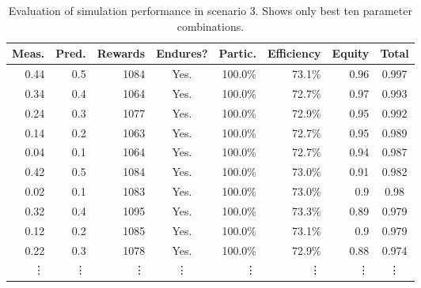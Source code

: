 \begin{table}
\centering
\caption[Evaluation of simulation performance in scenario 3.]{Evaluation of simulation performance in scenario 3. Shows only best ten parameter combinations.}\label{tab:staticfixed1}
\begin{tabular}{rr|rcrrr|c}
Meas. & Pred. & Rewards & Endures? & Partic. & Efficiency & Equity & Total \\
\hline
0.44 & 0.5 & 1084 & Yes. & 100.0\% & 73.1\% & 0.96 & 0.997 \\
0.34 & 0.4 & 1064 & Yes. & 100.0\% & 72.7\% & 0.97 & 0.993 \\
0.24 & 0.3 & 1077 & Yes. & 100.0\% & 72.9\% & 0.95 & 0.992 \\
0.14 & 0.2 & 1063 & Yes. & 100.0\% & 72.7\% & 0.95 & 0.989 \\
0.04 & 0.1 & 1064 & Yes. & 100.0\% & 72.7\% & 0.94 & 0.987 \\
0.42 & 0.5 & 1084 & Yes. & 100.0\% & 73.0\% & 0.91 & 0.982 \\
0.02 & 0.1 & 1083 & Yes. & 100.0\% & 73.0\% & 0.9 & 0.98 \\
0.32 & 0.4 & 1095 & Yes. & 100.0\% & 73.3\% & 0.89 & 0.979 \\
0.12 & 0.2 & 1085 & Yes. & 100.0\% & 73.1\% & 0.9 & 0.979 \\
0.22 & 0.3 & 1078 & Yes. & 100.0\% & 72.9\% & 0.88 & 0.974 \\
\vdots & \vdots & \vdots & \vdots & \vdots & \vdots & \vdots & \vdots \\
\end{tabular}
\end{table}

